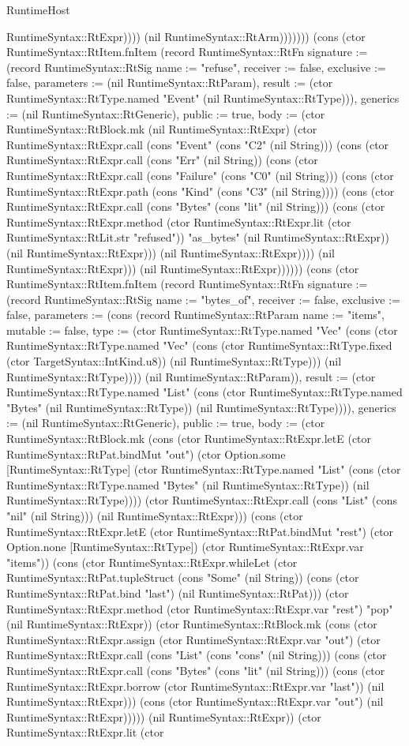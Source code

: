 \begin{lexlean}{RuntimeHost}
\begin{semanticmodule}
{RuntimeSyntax::RtExpr)))) (nil RuntimeSyntax::RtArm)))))})) (cons (ctor RuntimeSyntax::RtItem.fnItem (record RuntimeSyntax::RtFn {signature := (record RuntimeSyntax::RtSig {name := "refuse", receiver := false, exclusive := false, parameters := (nil RuntimeSyntax::RtParam), result := (ctor RuntimeSyntax::RtType.named "Event" (nil RuntimeSyntax::RtType))}), generics := (nil RuntimeSyntax::RtGeneric), public := true, body := (ctor RuntimeSyntax::RtBlock.mk (nil RuntimeSyntax::RtExpr) (ctor RuntimeSyntax::RtExpr.call (cons "Event" (cons "C2" (nil String))) (cons (ctor RuntimeSyntax::RtExpr.call (cons "Err" (nil String)) (cons (ctor RuntimeSyntax::RtExpr.call (cons "Failure" (cons "C0" (nil String))) (cons (ctor RuntimeSyntax::RtExpr.path (cons "Kind" (cons "C3" (nil String)))) (cons (ctor RuntimeSyntax::RtExpr.call (cons "Bytes" (cons "lit" (nil String))) (cons (ctor RuntimeSyntax::RtExpr.method (ctor RuntimeSyntax::RtExpr.lit (ctor RuntimeSyntax::RtLit.str "refused")) "as_bytes" (nil RuntimeSyntax::RtExpr)) (nil RuntimeSyntax::RtExpr))) (nil RuntimeSyntax::RtExpr)))) (nil RuntimeSyntax::RtExpr))) (nil RuntimeSyntax::RtExpr))))})) (cons (ctor RuntimeSyntax::RtItem.fnItem (record RuntimeSyntax::RtFn {signature := (record RuntimeSyntax::RtSig {name := "bytes_of", receiver := false, exclusive := false, parameters := (cons (record RuntimeSyntax::RtParam {name := "items", mutable := false, type := (ctor RuntimeSyntax::RtType.named "Vec" (cons (ctor RuntimeSyntax::RtType.named "Vec" (cons (ctor RuntimeSyntax::RtType.fixed (ctor TargetSyntax::IntKind.u8)) (nil RuntimeSyntax::RtType))) (nil RuntimeSyntax::RtType)))}) (nil RuntimeSyntax::RtParam)), result := (ctor RuntimeSyntax::RtType.named "List" (cons (ctor RuntimeSyntax::RtType.named "Bytes" (nil RuntimeSyntax::RtType)) (nil RuntimeSyntax::RtType)))}), generics := (nil RuntimeSyntax::RtGeneric), public := true, body := (ctor RuntimeSyntax::RtBlock.mk (cons (ctor RuntimeSyntax::RtExpr.letE (ctor RuntimeSyntax::RtPat.bindMut "out") (ctor Option.some [RuntimeSyntax::RtType] (ctor RuntimeSyntax::RtType.named "List" (cons (ctor RuntimeSyntax::RtType.named "Bytes" (nil RuntimeSyntax::RtType)) (nil RuntimeSyntax::RtType)))) (ctor RuntimeSyntax::RtExpr.call (cons "List" (cons "nil" (nil String))) (nil RuntimeSyntax::RtExpr))) (cons (ctor RuntimeSyntax::RtExpr.letE (ctor RuntimeSyntax::RtPat.bindMut "rest") (ctor Option.none [RuntimeSyntax::RtType]) (ctor RuntimeSyntax::RtExpr.var "items")) (cons (ctor RuntimeSyntax::RtExpr.whileLet (ctor RuntimeSyntax::RtPat.tupleStruct (cons "Some" (nil String)) (cons (ctor RuntimeSyntax::RtPat.bind "last") (nil RuntimeSyntax::RtPat))) (ctor RuntimeSyntax::RtExpr.method (ctor RuntimeSyntax::RtExpr.var "rest") "pop" (nil RuntimeSyntax::RtExpr)) (ctor RuntimeSyntax::RtBlock.mk (cons (ctor RuntimeSyntax::RtExpr.assign (ctor RuntimeSyntax::RtExpr.var "out") (ctor RuntimeSyntax::RtExpr.call (cons "List" (cons "cons" (nil String))) (cons (ctor RuntimeSyntax::RtExpr.call (cons "Bytes" (cons "lit" (nil String))) (cons (ctor RuntimeSyntax::RtExpr.borrow (ctor RuntimeSyntax::RtExpr.var "last")) (nil RuntimeSyntax::RtExpr))) (cons (ctor RuntimeSyntax::RtExpr.var "out") (nil RuntimeSyntax::RtExpr))))) (nil RuntimeSyntax::RtExpr)) (ctor RuntimeSyntax::RtExpr.lit (ctor }
\end{semanticmodule}
\end{lexlean}
